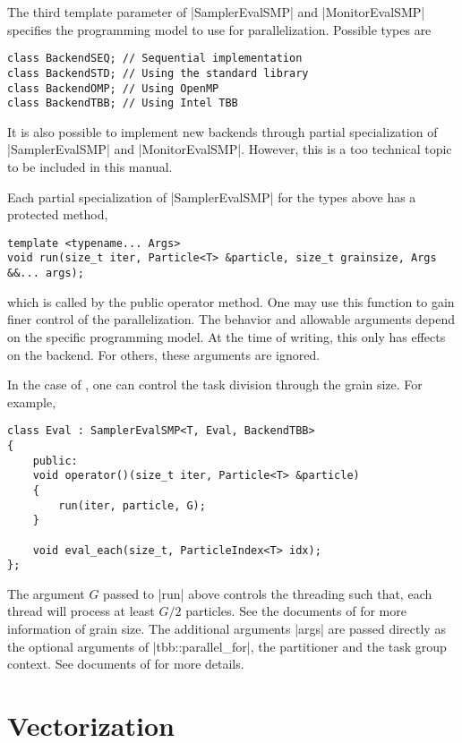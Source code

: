 The third template parameter of |SamplerEvalSMP| and |MonitorEvalSMP| specifies
the programming model to use for parallelization. Possible types are
\begin{Verbatim}
class BackendSEQ; // Sequential implementation
class BackendSTD; // Using the standard library
class BackendOMP; // Using OpenMP
class BackendTBB; // Using Intel TBB
\end{Verbatim}
It is also possible to implement new backends through partial specialization of
|SamplerEvalSMP| and |MonitorEvalSMP|. However, this is a too technical topic
to be included in this manual.

Each partial specialization of |SamplerEvalSMP| for the types above has a
protected method,
\begin{Verbatim}
template <typename... Args>
void run(size_t iter, Particle<T> &particle, size_t grainsize, Args &&... args);
\end{Verbatim}
which is called by the public operator method. One may use this function to
gain finer control of the parallelization. The behavior and allowable arguments
depend on the specific programming model. At the time of writing, this only has
effects on the \tbb backend. For others, these arguments are ignored.

In the case of \tbb, one can control the task division through the grain size.
For example,
\begin{Verbatim}
class Eval : SamplerEvalSMP<T, Eval, BackendTBB>
{
    public:
    void operator()(size_t iter, Particle<T> &particle)
    {
        run(iter, particle, G);
    }

    void eval_each(size_t, ParticleIndex<T> idx);
};
\end{Verbatim}
The argument $G$ passed to |run| above controls the threading such that, each
thread will process at least $G / 2$ particles. See the documents of \tbb for
more information of grain size. The additional arguments |args| are passed
directly as the optional arguments of |tbb::parallel_for|, the partitioner and
the task group context. See documents of \tbb for more details.

\section{Vectorization}
\label{sec:Vectorization}

